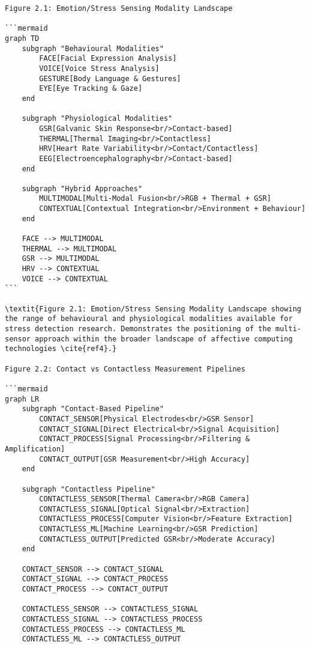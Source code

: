 \begin{verbatim}
Figure 2.1: Emotion/Stress Sensing Modality Landscape

```mermaid
graph TD
    subgraph "Behavioural Modalities"
        FACE[Facial Expression Analysis]
        VOICE[Voice Stress Analysis]
        GESTURE[Body Language & Gestures]
        EYE[Eye Tracking & Gaze]
    end

    subgraph "Physiological Modalities"
        GSR[Galvanic Skin Response<br/>Contact-based]
        THERMAL[Thermal Imaging<br/>Contactless]
        HRV[Heart Rate Variability<br/>Contact/Contactless]
        EEG[Electroencephalography<br/>Contact-based]
    end

    subgraph "Hybrid Approaches"
        MULTIMODAL[Multi-Modal Fusion<br/>RGB + Thermal + GSR]
        CONTEXTUAL[Contextual Integration<br/>Environment + Behaviour]
    end

    FACE --> MULTIMODAL
    THERMAL --> MULTIMODAL
    GSR --> MULTIMODAL
    HRV --> CONTEXTUAL
    VOICE --> CONTEXTUAL
```

\textit{Figure 2.1: Emotion/Stress Sensing Modality Landscape showing the range of behavioural and physiological modalities available for stress detection research. Demonstrates the positioning of the multi-sensor approach within the broader landscape of affective computing technologies \cite{ref4}.}

Figure 2.2: Contact vs Contactless Measurement Pipelines

```mermaid
graph LR
    subgraph "Contact-Based Pipeline"
        CONTACT_SENSOR[Physical Electrodes<br/>GSR Sensor]
        CONTACT_SIGNAL[Direct Electrical<br/>Signal Acquisition]
        CONTACT_PROCESS[Signal Processing<br/>Filtering & Amplification]
        CONTACT_OUTPUT[GSR Measurement<br/>High Accuracy]
    end

    subgraph "Contactless Pipeline"
        CONTACTLESS_SENSOR[Thermal Camera<br/>RGB Camera]
        CONTACTLESS_SIGNAL[Optical Signal<br/>Extraction]
        CONTACTLESS_PROCESS[Computer Vision<br/>Feature Extraction]
        CONTACTLESS_ML[Machine Learning<br/>GSR Prediction]
        CONTACTLESS_OUTPUT[Predicted GSR<br/>Moderate Accuracy]
    end

    CONTACT_SENSOR --> CONTACT_SIGNAL
    CONTACT_SIGNAL --> CONTACT_PROCESS
    CONTACT_PROCESS --> CONTACT_OUTPUT

    CONTACTLESS_SENSOR --> CONTACTLESS_SIGNAL
    CONTACTLESS_SIGNAL --> CONTACTLESS_PROCESS
    CONTACTLESS_PROCESS --> CONTACTLESS_ML
    CONTACTLESS_ML --> CONTACTLESS_OUTPUT


\end{verbatim}
